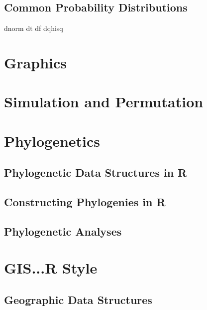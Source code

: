 \documentclass[12pt]{article}
\newenvironment{verbatim}{ 
	\indent
	\begin{list}{}{\setlength{\itemsep}{-1.5mm}}
}{
	\end{list}
}
\begin{document}
\subsection{Common Probability Distributions}		\label{sec:distrib}
\begin{verbatim}
	dnorm
	dt
	df
	dqhisq
\end{verbatim}


\section{Graphics}	\label{sec:plotting}
\section{Simulation and Permutation}	\label{sec:notbasic}
\section{Phylogenetics}	\label{sec:phylo}

\subsection{Phylogenetic Data Structures in R}

\subsection{Constructing Phylogenies in R}

\subsection{Phylogenetic Analyses}

\section{GIS...R Style}	\label{sec:geo}

\subsection{Geographic Data Structures}
\end{document}
